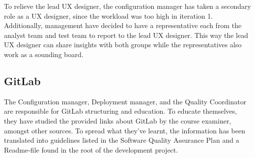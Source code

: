 To relieve the lead UX designer, the configuration manager has taken a secondary role as a UX designer, since the workload was too high in iteration 1. Additionally, management have decided to have a representative each from the analyst team and test team to report to the lead UX designer. This way the lead UX designer can share insights with both groups while the representatives also work as a sounding board. 

\subsection{GitLab}
\label{sec:r&d:git}
The Configuration manager, Deployment manager, and the Quality Coordinator are responsible for GitLab structuring and education. To educate themselves, they have studied the provided links about GitLab by the course examiner, amongst other sources. To spread what they've learnt, the information has been translated into guidelines listed in the Software Quality Assurance Plan and a Readme-file found in the root of the development project. 
